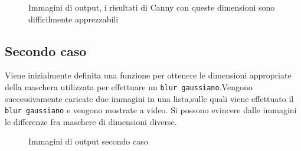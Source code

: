 \documentclass[10pt]{article}
\begin{document}
\begin{figure}[H]
	\centering
	\caption{Immagini di output, i risultati di Canny con queste dimensioni sono difficilmente apprezzabili}
	\label{fig:case1out.png}
\end{figure}

\clearpage
\subsection{Secondo caso}
Viene inizialmente definita una funzione per ottenere le dimensioni appropriate della maschera utilizzata per effettuare un \texttt{blur gaussiano}.Vengono successivamente caricate due immagini in una lista,sulle quali viene effettuato il \texttt{blur gaussiano} e vengono mostrate a video. Si possono evincere dalle immagini le differenze fra maschere di dimensioni diverse.



\begin{figure}[H]
	\centering
	\caption{Immagini di output secondo caso}
	\label{fig:case2out.png}
\end{figure}
\end{document}
